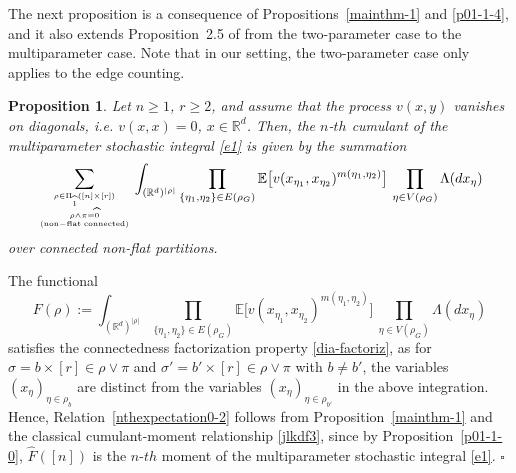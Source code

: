 \documentclass[12pt]{article}
\newcommand{\R}{\mathbb{R}}
\newcommand{\E}{\mathbb{E}}
\newtheorem{prop}{Proposition}[section]
\def\real{{\mathord{\mathbb R}}}
\newenvironment{Proof}{\removelastskip\par\medskip
\noindent{\em Proof.} \rm}{\penalty-20\null\hfill$\square$\par\medbreak}
\numberwithin{equation}{section}
\begin{document}
The next proposition is a consequence of Propositions~\ref{mainthm-1}
and \ref{p01-1-4},
 and it also extends Proposition~2.5 of \cite{jansen}
 from the two-parameter case to the multiparameter
 case. 
 Note that in our setting, the two-parameter case
 only applies to the edge counting. 
\begin{prop}
\label{p01-1} 
Let $n \geq 1$, $r \geq 2$, and assume that the process $v(x,y)$ vanishes
on diagonals, i.e. $v(x,x) = 0$, $x\in \real^d$. 
Then, the $n$-$th$ cumulant of the multiparameter stochastic integral
 \eqref{e1} is given by the summation 
\begin{equation}
  \label{nthexpectation0-2}
  \sum_{\rho \in \Pi_{\widehat{1}} ( [n] \times [r])
    \atop
    {\rho \wedge \pi = \widehat{0}
    \atop {\rm (non-flat \ \! connected)}
    }
    }
    \int_{(\R^d )^{|\rho |}}
      \prod_{\{\eta_1,\eta_2\} \in E(\rho_G)}
  \E \big[ v (x_{\eta_1},x_{\eta_2})^{m({\eta_1,\eta_2})} \big] 
 \ \! \prod_{\eta \in V(\rho_G)}
\Lambda(dx_\eta )
\end{equation}
over connected non-flat partitions.
\end{prop}
\begin{Proof}
 The functional 
\begin{equation}
\nonumber %
F(\rho ):=
\int_{(\R^d )^{|\rho |}}
  \prod_{\{\eta_1,\eta_2\} \in E(\rho_G)}
 \E \big[ v(x_{\eta_1},x_{\eta_2})^{m({\eta_1,\eta_2})} \big] 
   \ \! \prod_{\eta \in V(\rho_G)}
\Lambda(dx_\eta )
\end{equation}
 satisfies the connectedness factorization property
 \eqref{dia-factoriz}, as for
 $\sigma = b \times [r] \in \rho \vee \pi$ and
 $\sigma' = b' \times [r] \in \rho \vee \pi$
 with $b \not= b'$, the variables $(x_\eta )_{\eta \in \rho_b}$
 are distinct from the variables $(x_\eta )_{\eta \in \rho_{b'}}$
 in the above integration. 
 Hence, Relation~\eqref{nthexpectation0-2} follows from Proposition~\ref{mainthm-1}
 and the classical cumulant-moment relationship \eqref{jlkdf3},
 since by Proposition~\ref{p01-1-0},
 $\widehat{F}([n])$ is the $n$-$th$ moment of the multiparameter stochastic integral \eqref{e1}. 
\end{Proof}
\end{document}
